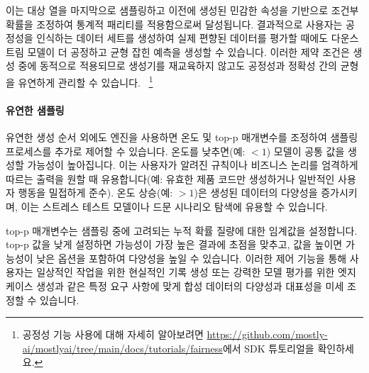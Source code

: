 이는 대상 열을 마지막으로 샘플링하고 이전에 생성된 민감한 속성을 기반으로 조건부 확률을 조정하여 통계적 패리티를 적용함으로써 달성됩니다. 결과적으로 사용자는 공정성을 인식하는 데이터 세트를 생성하여 실제 편향된 데이터를 평가할 때에도 다운스트림 모델이 더 공정하고 균형 잡힌 예측을 생성할 수 있습니다. 이러한 제약 조건은 생성 중에 동적으로 적용되므로 생성기를 재교육하지 않고도 공정성과 정확성 간의 균형을 유연하게 관리할 수 있습니다. ~\cite{krc23}\footnote{공정성 기능 사용에 대해 자세히 알아보려면 \url{https://github.com/mostly-ai/mostlyai/tree/main/docs/tutorials/fairness}에서 SDK 튜토리얼을 확인하세요.}





\paragraph{유연한 샘플링}
유연한 생성 순서 외에도 엔진을 사용하면 온도 및 top-p 매개변수를 조정하여 샘플링 프로세스를 추가로 제어할 수 있습니다. 온도를 낮추면(예: $< 1$) 모델이 공통 값을 생성할 가능성이 높아집니다. 이는 사용자가 알려진 규칙이나 비즈니스 논리를 엄격하게 따르는 출력을 원할 때 유용합니다(예: 유효한 제품 코드만 생성하거나 일반적인 사용자 행동을 밀접하게 준수). 온도 상승(예: $> 1$)은 생성된 데이터의 다양성을 증가시키며, 이는 스트레스 테스트 모델이나 드문 시나리오 탐색에 유용할 수 있습니다.

top-p 매개변수는 샘플링 중에 고려되는 누적 확률 질량에 대한 임계값을 설정합니다. top-p 값을 낮게 설정하면 가능성이 가장 높은 결과에 초점을 맞추고, 값을 높이면 가능성이 낮은 옵션을 포함하여 다양성을 높일 수 있습니다. 이러한 제어 기능을 통해 사용자는 일상적인 작업을 위한 현실적인 기록 생성 또는 강력한 모델 평가를 위한 엣지 케이스 생성과 같은 특정 요구 사항에 맞게 합성 데이터의 다양성과 대표성을 미세 조정할 수 있습니다.

